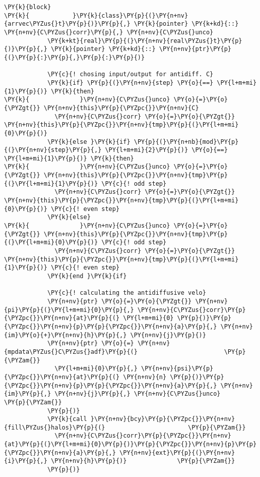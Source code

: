 \begin{Verbatim}[commandchars=\\\{\}]
          \PY{k}{block}
\PY{k}{            }\PY{k}{class}\PY{p}{(}\PY{n+nv}{arrvec\PYZus{}t}\PY{p}{)}\PY{p}{,} \PY{k}{pointer} \PY{k+kd}{::} \PY{n+nv}{C\PYZus{}corr}\PY{p}{,} \PY{n+nv}{C\PYZus{}unco}
            \PY{k+kt}{real}\PY{p}{(}\PY{n+nv}{real\PYZus{}t}\PY{p}{)}\PY{p}{,} \PY{k}{pointer} \PY{k+kd}{::} \PY{n+nv}{ptr}\PY{p}{(}\PY{p}{:}\PY{p}{,}\PY{p}{:}\PY{p}{)}

            \PY{c}{! chosing input/output for antidiff. C}
            \PY{k}{if} \PY{p}{(}\PY{n+nv}{step} \PY{o}{==} \PY{l+m+mi}{1}\PY{p}{)} \PY{k}{then}
\PY{k}{              }\PY{n+nv}{C\PYZus{}unco} \PY{o}{=}\PY{o}{\PYZgt{}} \PY{n+nv}{this}\PY{p}{\PYZpc{}}\PY{n+nv}{C}
              \PY{n+nv}{C\PYZus{}corr} \PY{o}{=}\PY{o}{\PYZgt{}} \PY{n+nv}{this}\PY{p}{\PYZpc{}}\PY{n+nv}{tmp}\PY{p}{(}\PY{l+m+mi}{0}\PY{p}{)}
            \PY{k}{else }\PY{k}{if} \PY{p}{(}\PY{n+nb}{mod}\PY{p}{(}\PY{n+nv}{step}\PY{p}{,} \PY{l+m+mi}{2}\PY{p}{)} \PY{o}{==} \PY{l+m+mi}{1}\PY{p}{)} \PY{k}{then}
\PY{k}{              }\PY{n+nv}{C\PYZus{}unco} \PY{o}{=}\PY{o}{\PYZgt{}} \PY{n+nv}{this}\PY{p}{\PYZpc{}}\PY{n+nv}{tmp}\PY{p}{(}\PY{l+m+mi}{1}\PY{p}{)} \PY{c}{! odd step}
              \PY{n+nv}{C\PYZus{}corr} \PY{o}{=}\PY{o}{\PYZgt{}} \PY{n+nv}{this}\PY{p}{\PYZpc{}}\PY{n+nv}{tmp}\PY{p}{(}\PY{l+m+mi}{0}\PY{p}{)} \PY{c}{! even step}
            \PY{k}{else}
\PY{k}{              }\PY{n+nv}{C\PYZus{}unco} \PY{o}{=}\PY{o}{\PYZgt{}} \PY{n+nv}{this}\PY{p}{\PYZpc{}}\PY{n+nv}{tmp}\PY{p}{(}\PY{l+m+mi}{0}\PY{p}{)} \PY{c}{! odd step}
              \PY{n+nv}{C\PYZus{}corr} \PY{o}{=}\PY{o}{\PYZgt{}} \PY{n+nv}{this}\PY{p}{\PYZpc{}}\PY{n+nv}{tmp}\PY{p}{(}\PY{l+m+mi}{1}\PY{p}{)} \PY{c}{! even step}
            \PY{k}{end }\PY{k}{if}

            \PY{c}{! calculating the antidiffusive velo}
            \PY{n+nv}{ptr} \PY{o}{=}\PY{o}{\PYZgt{}} \PY{n+nv}{pi}\PY{p}{(}\PY{l+m+mi}{0}\PY{p}{,} \PY{n+nv}{C\PYZus{}corr}\PY{p}{\PYZpc{}}\PY{n+nv}{at}\PY{p}{(} \PY{l+m+mi}{0} \PY{p}{)}\PY{p}{\PYZpc{}}\PY{n+nv}{p}\PY{p}{\PYZpc{}}\PY{n+nv}{a}\PY{p}{,} \PY{n+nv}{im}\PY{o}{+}\PY{n+nv}{h}\PY{p}{,} \PY{n+nv}{j}\PY{p}{)}
            \PY{n+nv}{ptr} \PY{o}{=} \PY{n+nv}{mpdata\PYZus{}C\PYZus{}adf}\PY{p}{(}                        \PY{p}{\PYZam{}}
              \PY{l+m+mi}{0}\PY{p}{,} \PY{n+nv}{psi}\PY{p}{\PYZpc{}}\PY{n+nv}{at}\PY{p}{(} \PY{n+nv}{n} \PY{p}{)}\PY{p}{\PYZpc{}}\PY{n+nv}{p}\PY{p}{\PYZpc{}}\PY{n+nv}{a}\PY{p}{,} \PY{n+nv}{im}\PY{p}{,} \PY{n+nv}{j}\PY{p}{,} \PY{n+nv}{C\PYZus{}unco}        \PY{p}{\PYZam{}}
            \PY{p}{)}      
            \PY{k}{call }\PY{n+nv}{bcy}\PY{p}{\PYZpc{}}\PY{n+nv}{fill\PYZus{}halos}\PY{p}{(}                       \PY{p}{\PYZam{}}
              \PY{n+nv}{C\PYZus{}corr}\PY{p}{\PYZpc{}}\PY{n+nv}{at}\PY{p}{(}\PY{l+m+mi}{0}\PY{p}{)}\PY{p}{\PYZpc{}}\PY{n+nv}{p}\PY{p}{\PYZpc{}}\PY{n+nv}{a}\PY{p}{,} \PY{n+nv}{ext}\PY{p}{(}\PY{n+nv}{i}\PY{p}{,} \PY{n+nv}{h}\PY{p}{)}              \PY{p}{\PYZam{}}
            \PY{p}{)}


\end{Verbatim}
